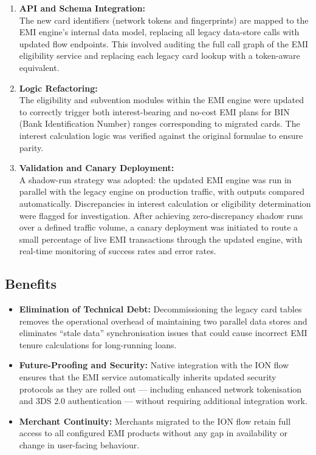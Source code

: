 \begin{enumerate}
  \item \textbf{API and Schema Integration:}\\
  The new card identifiers (network tokens and fingerprints) are mapped to the EMI engine's internal data model, replacing all legacy data-store calls with updated flow endpoints. This involved auditing the full call graph of the EMI eligibility service and replacing each legacy card lookup with a token-aware equivalent.

  \item \textbf{Logic Refactoring:}\\
  The eligibility and subvention modules within the EMI engine were updated to correctly trigger both interest-bearing and no-cost EMI plans for BIN (Bank Identification Number) ranges corresponding to migrated cards. The interest calculation logic was verified against the original formulae to ensure parity.

  \item \textbf{Validation and Canary Deployment:}\\
  A shadow-run strategy was adopted: the updated EMI engine was run in parallel with the legacy engine on production traffic, with outputs compared automatically. Discrepancies in interest calculation or eligibility determination were flagged for investigation. After achieving zero-discrepancy shadow runs over a defined traffic volume, a canary deployment was initiated to route a small percentage of live EMI transactions through the updated engine, with real-time monitoring of success rates and error rates.
\end{enumerate}

\subsection{Benefits}

\begin{itemize}
  \item \textbf{Elimination of Technical Debt:} Decommissioning the legacy card tables removes the operational overhead of maintaining two parallel data stores and eliminates ``stale data'' synchronisation issues that could cause incorrect EMI tenure calculations for long-running loans.
  \item \textbf{Future-Proofing and Security:} Native integration with the ION flow ensures that the EMI service automatically inherits updated security protocols as they are rolled out --- including enhanced network tokenisation and 3DS 2.0 authentication --- without requiring additional integration work.
  \item \textbf{Merchant Continuity:} Merchants migrated to the ION flow retain full access to all configured EMI products without any gap in availability or change in user-facing behaviour.
\end{itemize}

